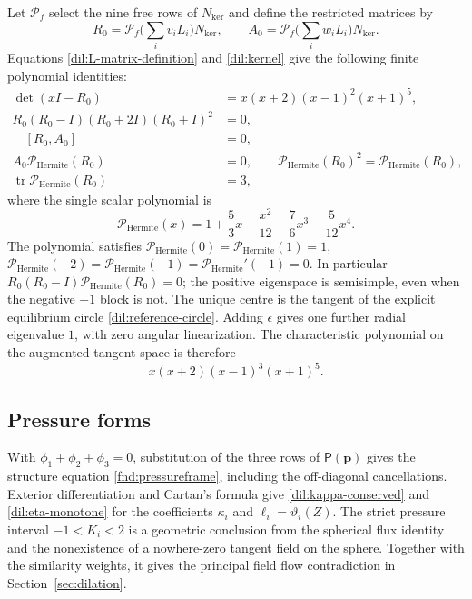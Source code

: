 \documentclass[11pt,a4paper]{article}
\numberwithin{equation}{section}
\theoremstyle{plain}
\theoremstyle{definition}
\theoremstyle{remark}
\begin{document}
Let $\mathcal P_f$ select the nine free rows of $N_{\mathrm{ker}}$ and define the restricted matrices by
\begin{equation}\label{dil:restricted-matrices}
 R_0=\mathcal P_f\Big(\sum_iv_iL_i\Big)N_{\mathrm{ker}},\qquad
 A_0=\mathcal P_f\Big(\sum_iw_iL_i\Big)N_{\mathrm{ker}}.
\end{equation}
Equations \eqref{dil:L-matrix-definition} and \eqref{dil:kernel}
give the following finite polynomial identities:
\begin{align}\label{dil:matrix-identities}
 \det(xI-R_0)&=x(x+2)(x-1)^2(x+1)^5,\\
 R_0(R_0-I)(R_0+2I)(R_0+I)^2&=0,\nonumber\\
 \quad [R_0,A_0]&=0,\nonumber\\
 A_0\mathcal P_{\mathrm{Hermite}}(R_0)&=0,\qquad \mathcal P_{\mathrm{Hermite}}(R_0)^2=\mathcal P_{\mathrm{Hermite}}(R_0),\nonumber\\
 \operatorname{tr}\mathcal P_{\mathrm{Hermite}}(R_0)&=3,\nonumber
\end{align}
where the single scalar polynomial is
\begin{equation}\label{dil:hermite-projector}
                  \mathcal P_{\mathrm{Hermite}}(x)=1+\frac53x-\frac{x^2}{12}
                            -\frac76x^3-\frac5{12}x^4.
\end{equation}
The polynomial satisfies $\mathcal P_{\mathrm{Hermite}}(0)=\mathcal P_{\mathrm{Hermite}}(1)=1$, $\mathcal P_{\mathrm{Hermite}}(-2)=\mathcal P_{\mathrm{Hermite}}(-1)=\mathcal P_{\mathrm{Hermite}}'(-1)=0$.
In particular $R_0(R_0-I)\mathcal P_{\mathrm{Hermite}}(R_0)=0$; the positive eigenspace is
semisimple, even when the negative $-1$ block is not.  The unique
centre is the tangent of the explicit equilibrium circle
\eqref{dil:reference-circle}.
Adding $\epsilon$ gives one further radial eigenvalue $1$, with zero
angular linearization. The characteristic polynomial on the
augmented tangent space is therefore
\begin{equation}\label{dil:carrier-spectrum}
                 x(x+2)(x-1)^3(x+1)^5.
\end{equation}

\subsection{Pressure forms}

With $\phi_1+\phi_2+\phi_3=0$, substitution of the three rows of
 $\mathsf P(\boldsymbol p)$ gives the structure equation \eqref{fnd:pressureframe},
including the off-diagonal cancellations. Exterior differentiation and
Cartan's formula give \eqref{dil:kappa-conserved} and
\eqref{dil:eta-monotone} for the coefficients $\kappa_i$ and
$\ell_i=\vartheta_i(Z)$. The strict pressure interval
$-1<K_i<2$ is a geometric conclusion from the spherical flux identity
and the nonexistence of a nowhere-zero tangent field on the sphere. Together with the similarity weights, it gives the principal field flow contradiction in Section~\ref{sec:dilation}.
\end{document}
